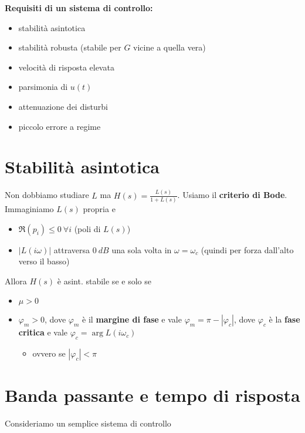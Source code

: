 \documentclass[10pt,a4paper]{book}
\begin{document}
\textbf{Requisiti di un sistema di controllo:}
\begin{itemize}
	\item stabilità asintotica
	\item stabilità robusta (stabile per $G$ vicine a quella vera)
	\item velocità di risposta elevata
	\item parsimonia di $u(t)$
	\item attenuazione dei disturbi
	\item piccolo errore a regime
\end{itemize}
\section{Stabilità asintotica}

Non dobbiamo studiare $L$ ma $H(s) =\frac{L(s)}{1+L(s)}$. Usiamo il \textbf{criterio di Bode}. Immaginiamo $L(s)$ propria e
\begin{itemize}
	\item $\Re(p_i) \leqslant 0\ \forall i$ (poli di $L(s)$)
	\item $| L(i\omega)| $ attraversa $0\ \si{dB}$ una sola volta in $\omega =\omega _c$ (quindi per forza dall'alto verso il basso)
\end{itemize}

Allora $H(s)$ è asint. stabile se e solo se
\begin{itemize}
	\item $\mu  >0$
	\item $\varphi _m  >0$, dove $\varphi _m$ è il \textbf{margine di fase} e vale $\varphi _m =\pi -| \varphi _c| $, dove $\varphi _c$ è la \textbf{fase critica} e vale $\varphi _c =\arg L(i\omega _c)$
	      \begin{itemize}
	      	\item ovvero se $| \varphi _c| < \pi $
	      \end{itemize}
\end{itemize}
\section{Banda passante e tempo di risposta}

Consideriamo un semplice sistema di controllo
\end{document}
